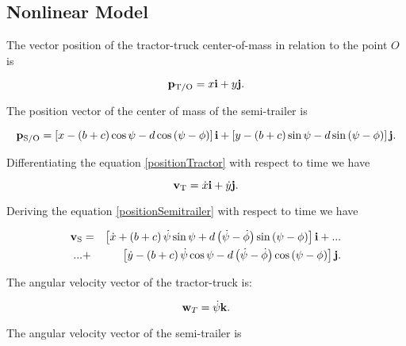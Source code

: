 \documentclass[sublist]{fei}
\begin{document}
\subsection{Nonlinear Model}

The vector position of the tractor-truck center-of-mass in relation to the point \(O \) is

\begin{equation} \label{positionTractor}
    {\bf p}_{{\rm T}/{\rm O}} = x {\bf i} + y {\bf j}.
\end{equation}

The position vector of the center of mass of the semi-trailer is

\begin{equation} \label{positionSemitrailer}
    {\bf p}_{{\rm S}/{\rm O}} = \left[ x - \left( b + c \right) \cos \psi - d \cos \left( \psi - \phi \right) \right] {\bf i} + \left[ y - \left( b + c \right) \sin \psi - d \sin \left( \psi - \phi \right) \right] {\bf j}.
\end{equation}

Differentiating the equation \eqref {positionTractor} with respect to time we have

\begin{equation} \label{velocityTractor}
    {\bf v}_{\rm T} = \dot{x} {\bf i} + \dot{y} {\bf j}.
\end{equation}

Deriving the equation \eqref {positionSemitrailer} with respect to time we have

\begin{eqnarray} \label{velocitySemitrailer}
    \nonumber
    {\bf v}_{\rm S} &=& \left[ \dot{x} + \left( b + c \right) \dot{\psi} \sin \psi + d \left( \dot{\psi} - \dot{\phi} \right) \sin \left( \psi - \phi \right) \right] {\bf i} + ... \\
    \nonumber
     ... &+& \left[ \dot{y} - \left( b + c \right) \dot{\psi} \cos \psi - d \left( \dot{\psi} - \dot{\phi} \right) \cos \left( \psi - \phi \right) \right] {\bf j}. \\
\end{eqnarray}


The angular velocity vector of the tractor-truck is:

\begin{equation} \label{angulaVelTrailer}
    {\bf w}_T = \dot{\psi} {\bf k}.
\end{equation}

The angular velocity vector of the semi-trailer is
\end{document}
